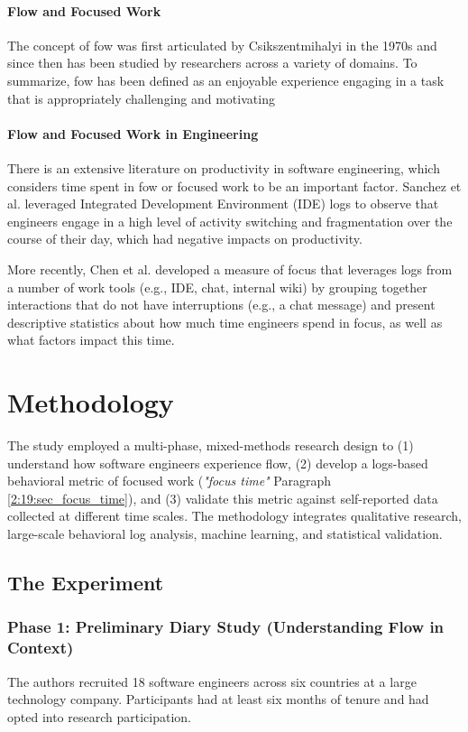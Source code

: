 \paragraph{Flow and Focused Work}
The concept of fow was first articulated by Csikszentmihalyi in the 1970s and since then has been studied by researchers across a variety of domains. To summarize, fow has been defined as an enjoyable experience engaging in a task that is appropriately challenging and motivating

\paragraph{Flow and Focused Work in Engineering}
There is an extensive literature on productivity in software engineering, which considers time spent in fow or focused work to be an important factor. Sanchez et al. leveraged Integrated Development Environment (IDE) logs to observe that engineers engage in a high level of activity switching and fragmentation over the course of their day, which had negative impacts on productivity.

More recently, Chen et al. developed a measure of focus that leverages logs from a number of work tools (e.g., IDE, chat, internal wiki) by grouping together interactions that do not have interruptions (e.g., a chat message) and present descriptive statistics about how much time engineers spend in focus, as well as what factors impact this time.

\section{Methodology}
The study employed a multi-phase, mixed-methods research design to (1) understand how software engineers experience flow, (2) develop a logs-based behavioral metric of focused work (\textit{"focus time"} Paragraph \ref{2:19:sec_focus_time}), and (3) validate this metric against self-reported data collected at different time scales. The methodology integrates qualitative research, large-scale behavioral log analysis, machine learning, and statistical validation.
\subsection{The Experiment}
\subsubsection{Phase 1: Preliminary Diary Study (Understanding Flow in Context)}
The authors recruited 18 software engineers across six countries at a large technology company. Participants had at least six months of tenure and had opted into research participation.

